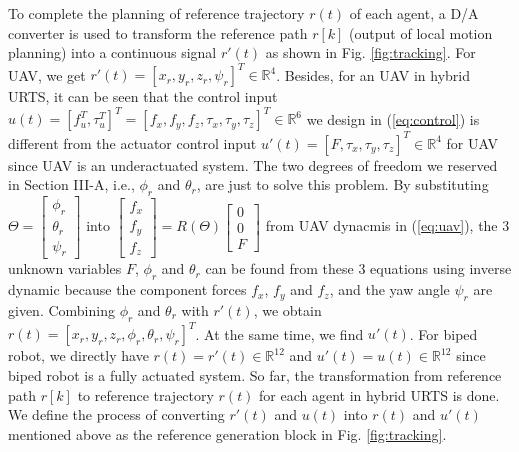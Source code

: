 \documentclass{ieeeaccess}
\begin{document}
To complete the planning of reference trajectory $r(t)$ of each agent, a D/A converter is used to transform the reference path $r[k]$ (output of local motion planning) into a continuous signal $r'(t)$ as shown in Fig. \ref{fig:tracking}. For UAV, we get $r'(t) = [x_r, y_r, z_r, \psi_r]^T\in\mathbb{R}^{4}$. Besides, for an UAV in hybrid URTS, it can be seen that the control input $u(t)=[f_u^T, \tau_u^T]^T = [f_x, f_y, f_z, \tau_x, \tau_y, \tau_z]^T\in\mathbb{R}^6$ we design in (\ref{eq:control}) is different from the actuator control input $u'(t)=[F, \tau_x, \tau_y, \tau_z]^T\in\mathbb{R}^4$ for UAV since UAV is an underactuated system. The two degrees of freedom we reserved in Section III-A, i.e., $\phi_r$ and $\theta_r$, are just to solve this problem. By substituting $\Theta=\begin{bmatrix}
    \phi_r \\ \theta_r \\ \psi_r
\end{bmatrix}$ into $\begin{bmatrix}
        f_x \\ f_y \\ f_z
\end{bmatrix} = R(\Theta)\begin{bmatrix}
        0 \\ 0 \\ F
\end{bmatrix}$ from UAV dynacmis in (\ref{eq:uav}), the 3 unknown variables $F$, $\phi_r$ and $\theta_r$ can be found from these 3 equations using inverse dynamic because the component forces $f_x$, $f_y$ and $f_z$, and the yaw angle $\psi_r$ are given. Combining $\phi_r$ and $\theta_r$ with $r'(t)$, we obtain $r(t)= [x_r, y_r, z_r, \phi_r, \theta_r, \psi_r]^T$. At the same time, we find $u'(t)$. For biped robot, we directly have $r(t)=r'(t)\in\mathbb{R}^{12}$ and $u'(t)=u(t)\in\mathbb{R}^{12}$ since biped robot is a fully actuated system. So far, the transformation from reference path $r[k]$ to reference trajectory $r(t)$ for each agent in hybrid URTS is done. We define the process of converting $r'(t)$ and $u(t)$ into $r(t)$ and $u'(t)$ mentioned above as the reference generation block in Fig. \ref{fig:tracking}.
\end{document}
